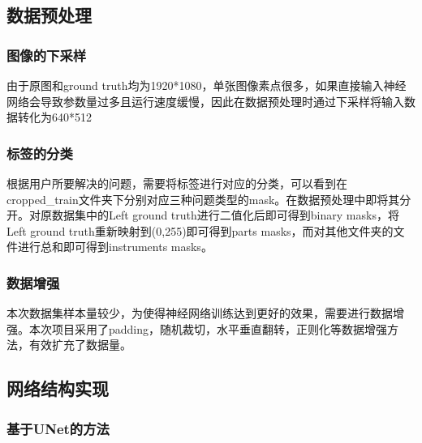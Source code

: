 \documentclass[UTF8]{ctexart}
\begin{document}
\subsection{数据预处理}
\subsubsection{图像的下采样}
由于原图和ground truth均为1920*1080，单张图像素点很多，如果直接输入神经网络会导致参数量过多且运行速度缓慢，因此在数据预处理时通过下采样将输入数据转化为640*512
\subsubsection{标签的分类}
根据用户所要解决的问题，需要将标签进行对应的分类，可以看到在cropped\_train文件夹下分别对应三种问题类型的mask。在数据预处理中即将其分开。对原数据集中的Left ground truth进行二值化后即可得到binary masks，将Left ground truth重新映射到(0,255)即可得到parts masks，而对其他文件夹的文件进行总和即可得到instruments masks。
\subsubsection{数据增强}
本次数据集样本量较少，为使得神经网络训练达到更好的效果，需要进行数据增强。本次项目采用了padding，随机裁切，水平垂直翻转，正则化等数据增强方法，有效扩充了数据量。

\subsection{网络结构实现}
\subsubsection{基于UNet的方法}
\end{document}
